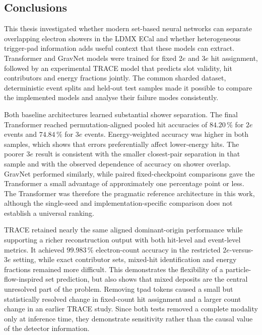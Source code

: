 \subsection{Conclusions}
\label{sec:conclusions}

This thesis investigated whether modern set-based neural networks can separate overlapping electron showers in the LDMX ECal and whether heterogeneous
trigger-pad information adds useful context that these models can extract. Transformer and GravNet models
were trained for fixed \(2e\) and \(3e\) hit assignment, followed by an
experimental TRACE model that predicts slot validity, hit contributors and
energy fractions jointly. The common sharded dataset, deterministic event
splits and held-out test samples made it possible to compare the implemented
models and analyse their failure modes consistently.

Both baseline architectures learned substantial shower separation. The final
Transformer reached permutation-aligned pooled hit accuracies of
\(84.20\,\%\) for \(2e\) events and \(74.84\,\%\) for \(3e\) events.
Energy-weighted accuracy was higher in both samples, which shows that errors
preferentially affect lower-energy hits. The poorer \(3e\) result is
consistent with the smaller closest-pair separation in that sample and with
the observed dependence of accuracy on shower overlap. GravNet performed
similarly, while paired fixed-checkpoint comparisons gave the Transformer a
small advantage of approximately one percentage point or less. The Transformer was
therefore the pragmatic reference architecture in this work, although the
single-seed and implementation-specific comparison does not establish a
universal ranking.

TRACE retained nearly the same aligned dominant-origin performance while supporting a richer reconstruction output with both hit-level and event-level metrics. It achieved
\(99.983\,\%\) electron-count accuracy in the restricted \(2e\)-versus-\(3e\)
setting, while exact contributor sets, mixed-hit identification and energy
fractions remained more difficult. This demonstrates the flexibility of a
particle-flow-inspired set prediction, but also shows that mixed deposits are
the central unresolved part of the problem. Removing \gls{tpad} tokens caused
a small but statistically resolved change in fixed-count hit assignment and a
larger count change in an earlier TRACE study. Since both tests
removed a complete modality only at inference time, they demonstrate
sensitivity rather than the causal value of the detector information.

